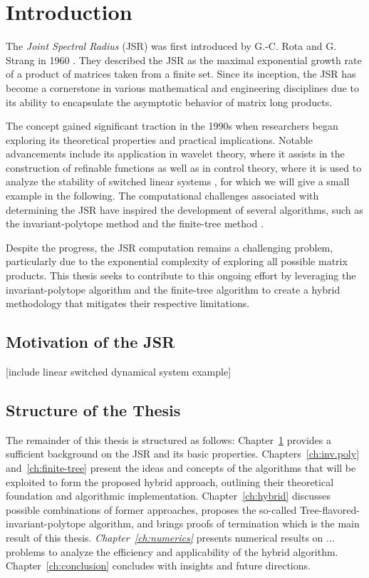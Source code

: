 
\chapter{Introduction}
\label{ch:introduction} %

The \textit{Joint Spectral Radius} (JSR) was first introduced by G.-C. Rota and G. Strang in 1960 \citep{rotaNoteJointSpectral1960}. They described the JSR as the maximal exponential growth rate of a product of matrices taken from a finite set. Since its inception, the JSR has become a cornerstone in various mathematical and engineering disciplines due to its ability to encapsulate the asymptotic behavior of matrix long products. 

The concept gained significant traction in the 1990s when researchers began exploring its theoretical properties and practical implications. Notable advancements include its application in wavelet theory, where it assists in the construction of refinable functions \citep{daubechies1992sets} as well as in control theory, where it is used to analyze the stability of switched linear systems \citep{blondelSurveyComputationalComplexity2000}, for which we will give a small example in the following. The computational challenges associated with determining the JSR have inspired the development of several algorithms, such as the invariant-polytope method \citep{guglielmiExactComputationJoint2013} and the finite-tree method \citep{mollerTreebasedApproachJoint2014}.

Despite the progress, the JSR computation remains a challenging problem, particularly due to the exponential complexity of exploring all possible matrix products. This thesis seeks to contribute to this ongoing effort by leveraging the invariant-polytope algorithm and the finite-tree algorithm to create a hybrid methodology that mitigates their respective limitations.

\section{Motivation of the JSR}
[include linear switched dynamical system example]

\section*{Structure of the Thesis}
The remainder of this thesis is structured as follows: Chapter~\ref{ch:introduction} provides a sufficient background on the JSR and its basic properties. Chapters~\ref{ch:inv.poly} and~\ref{ch:finite-tree} present the ideas and concepts of the algorithms that will be exploited to form the proposed hybrid approach, outlining their theoretical foundation and algorithmic implementation. Chapter~\ref{ch:hybrid} discusses possible combinations of former approaches, proposes the so-called Tree-flavored-invariant-polytope algorithm, and brings proofs of termination which is the main result of this thesis. \emph{Chapter~\ref{ch:numerics}} presents numerical results on ... problems to analyze the efficiency and applicability of the hybrid algorithm. Chapter~\ref{ch:conclusion} concludes with insights and future directions.

